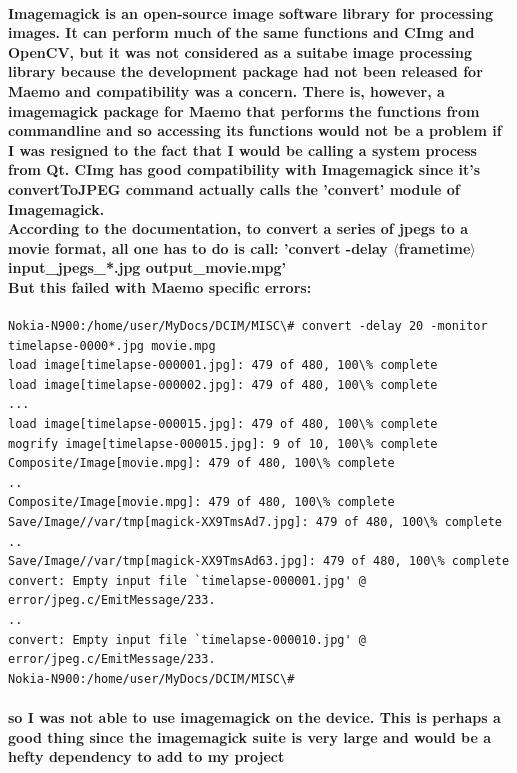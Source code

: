 \documentclass[11pt]{article} %
\begin{document}
\paragraph{Imagemagick is an open-source image software library for processing images. It can perform much of the same functions and CImg and OpenCV, but it was not considered as a suitabe image processing library because the development package had not been released for Maemo and compatibility was a concern. There is, however, a imagemagick package for Maemo that performs the functions from commandline and so accessing its functions would not be a problem if I was resigned to the fact that I would be calling a system process from Qt. CImg has good compatibility with Imagemagick since it's convertToJPEG command actually calls the 'convert' module of Imagemagick.\\
According to the documentation, to convert a series of jpegs to a movie format, all one has to do is call:
'convert -delay \(\langle\)frametime\(\rangle\) input\_jpegs\_*.jpg output\_movie.mpg'\\
But this failed with Maemo specific errors:}
\begin{verbatim}
Nokia-N900:/home/user/MyDocs/DCIM/MISC\# convert -delay 20 -monitor timelapse-0000*.jpg movie.mpg
load image[timelapse-000001.jpg]: 479 of 480, 100\% complete
load image[timelapse-000002.jpg]: 479 of 480, 100\% complete
...
load image[timelapse-000015.jpg]: 479 of 480, 100\% complete
mogrify image[timelapse-000015.jpg]: 9 of 10, 100\% complete
Composite/Image[movie.mpg]: 479 of 480, 100\% complete
..
Composite/Image[movie.mpg]: 479 of 480, 100\% complete
Save/Image//var/tmp[magick-XX9TmsAd7.jpg]: 479 of 480, 100\% complete
..
Save/Image//var/tmp[magick-XX9TmsAd63.jpg]: 479 of 480, 100\% complete
convert: Empty input file `timelapse-000001.jpg' @ error/jpeg.c/EmitMessage/233.
..
convert: Empty input file `timelapse-000010.jpg' @ error/jpeg.c/EmitMessage/233.
Nokia-N900:/home/user/MyDocs/DCIM/MISC\# 
\end{verbatim}
\paragraph{so I was not able to use imagemagick on the device. This is perhaps a good thing since the imagemagick suite is very large and would be a hefty dependency to add to my project
}
\end{document}
